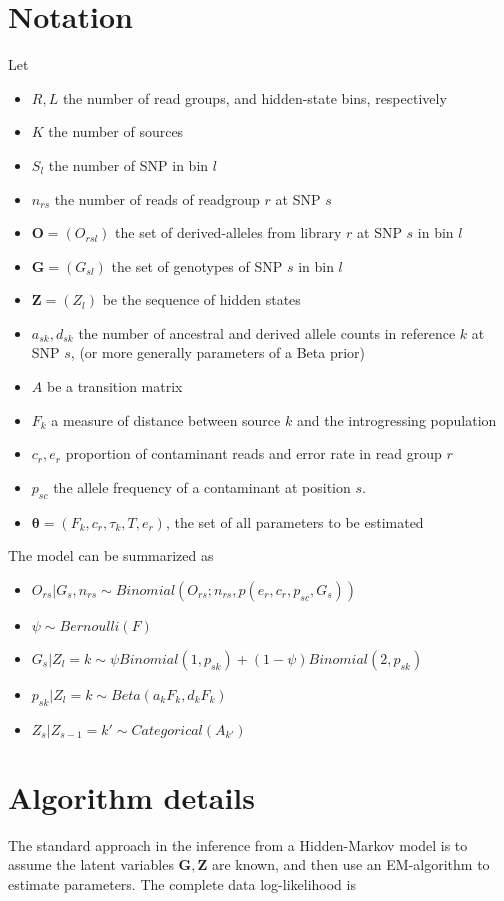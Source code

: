 \documentclass[10pt,a4paper]{article}
\newcommand{\BFZ}{\mathbf{Z}}
\newcommand{\BFG}{\mathbf{G}}
\newcommand{\BFO}{\mathbf{O}}
\begin{document}
\section*{Notation}
	Let 
	\begin{itemize}
		\item $R, L$ the number of read groups, and hidden-state bins, respectively
		\item $K$ the number of sources 
		\item $S_l$ the number of SNP in bin $l$
		\item $n_{rs}$ the number of reads of readgroup $r$ at SNP $s$
		\item $\BFO = (O_{rsl})$ the set of derived-alleles from library $r$ at SNP $s$ in bin $l$
		\item $\BFG = (G_{sl})$ the set of genotypes of SNP $s$ in bin $l$
		\item $\BFZ = (Z_l)$ be the sequence of hidden states
		\item $a_{sk}, d_{sk}$ the number of ancestral and derived allele counts in reference $k$ at SNP $s$, (or more generally parameters of a Beta prior)
		\item $A$ be a transition matrix		
		\item $F_k$ a measure of distance between source $k$ and the introgressing population
		\item $c_r, e_r$ proportion of contaminant reads and error rate in read group $r$
		\item $p_{sc}$ the allele frequency of a contaminant at position $s$. 
		\item $\mathbf{\theta} = (F_k, c_r, \tau_k, T, e_r)$, the set of all parameters to be estimated
	\end{itemize}
The model can be summarized as
	\begin{itemize}
		\item $O_{rs} | G_{s}, n_{rs} \sim Binomial(O_{rs}; n_{rs}, p(e_r, c_r, p_{sc}, G_{s}))$
		\item $\psi \sim Bernoulli(F)$
		\item $G_s|Z_l=k \sim \psi Binomial(1, p_{sk}) + (1-\psi) Binomial(2, p_{sk})$
		\item $p_{sk} | Z_l=k \sim Beta(a_kF_k, d_kF_k)$
		\item $Z_s | Z_{s-1}= k' \sim Categorical(A_{k'})$
	\end{itemize}

\section{Algorithm details}
The standard approach in the inference from a Hidden-Markov model is to assume the latent variables $\BFG, \BFZ$ are known, and then use an EM-algorithm to estimate parameters. The complete data log-likelihood is
\end{document}
